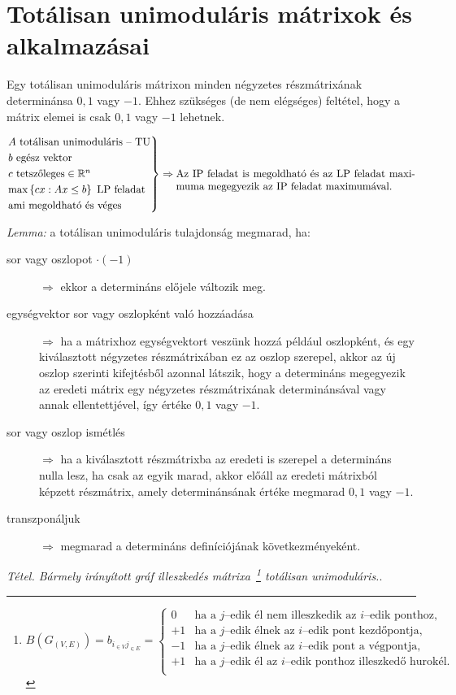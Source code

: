 \newpage
\section{Totálisan unimoduláris mátrixok és alkalmazásai}

Egy totálisan unimoduláris mátrixon minden négyzetes részmátrixának determinánsa
$0, 1$ vagy $-1$. Ehhez szükséges (de nem elégséges) feltétel, hogy a mátrix
elemei is csak $0, 1$ vagy $-1$ lehetnek.

\[
\begin{rcases}
A \text{ totálisan unimoduláris -- TU} \\
b \text{ egész vektor} \\
c \text{ tetszőleges} \in \mathbb{R}^n \\
\text{max} \left\{ cx:Ax \leq b \right\} \text{ LP feladat}\\
\text{ami megoldható és véges}
\end{rcases} \Rightarrow \parbox[t]{8cm}{ Az IP feladat is megoldható és az LP
feladat maximuma megegyezik az IP feladat maximumával.} \]

\emph{Lemma:} a totálisan unimoduláris tulajdonság megmarad, ha:

\begin{description}
\item[sor vagy oszlopot $\cdot (-1)$] $\Rightarrow$ ekkor a determináns
előjele változik meg.
\item[egységvektor sor vagy oszlopként való hozzáadása] $\Rightarrow$ ha a
mátrixhoz egységvektort veszünk hozzá például oszlopként, és egy kiválasztott
négyzetes részmátrixában ez az oszlop szerepel, akkor az új oszlop szerinti
kifejtésből azonnal látszik, hogy a determináns megegyezik az eredeti mátrix
egy négyzetes részmátrixának determinánsával vagy annak ellentettjével, így
értéke $0, 1$ vagy $-1$.
\item[sor vagy oszlop ismétlés] $\Rightarrow$ ha a kiválasztott részmátrixba
az eredeti is szerepel a determináns nulla lesz, ha csak az egyik marad, akkor
előáll az eredeti mátrixból képzett részmátrix, amely determinánsának értéke
megmarad $0, 1$ vagy $-1$.
\item[transzponáljuk] $\Rightarrow$ megmarad a determináns definíciójának
következményeként.
\end{description}

\emph{Tétel. Bármely irányított gráf illeszkedés mátrixa~\footnote{$
B(G_{(V,E)})=
b_{i_{\in V}j_{\in E}}=
\begin{cases}
0  & \text{ha a } j \text{--edik él nem illeszkedik az } i \text{--edik ponthoz,} \\
+1  & \text{ha a } j \text{--edik élnek az } i \text{--edik pont kezdőpontja,} \\
-1  & \text{ha a } j \text{--edik élnek az } i \text{--edik pont a végpontja,} \\
+1  & \text{ha a } j \text{--edik él az } i \text{--edik ponthoz illeszkedő hurokél.} \\
\end{cases}$} totálisan unimoduláris.}.
\vspace{0.4cm}

